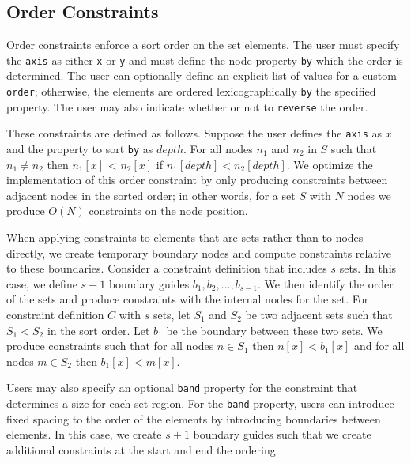 

\subsection{Order Constraints}
Order constraints enforce a sort order on the set elements. The user must 
specify the \texttt{axis} as either \texttt{x} or \texttt{y} and must define
the node property \texttt{by} which the order is determined. 
The user can optionally define an explicit list of values for a custom
\texttt{order}; otherwise, the elements are ordered lexicographically \texttt{by}
the specified property. The user may also indicate whether
or not to \texttt{reverse} the order.

These constraints are defined as follows.  Suppose the user defines the \texttt{axis} as
$x$ and the property to sort \texttt{by} as $depth$. For all nodes $n_1$ 
and $n_2$ in $S$  such that $n_1 \neq n_2$ then $n_1[x]$ < $n_2[x]$
if $n_1[depth] < n_2[depth]$. We optimize the implementation of this order
constraint by only producing constraints between adjacent nodes in the sorted 
order; in other words, for a set $S$ with $N$ nodes we produce $O(N)$ 
constraints on the node position.

When applying constraints to elements that are sets rather than to nodes
directly, we create temporary boundary nodes and compute constraints relative to
these boundaries. Consider a constraint definition that includes $s$ sets. 
In this case, we define $s-1$ boundary guides $b_1, b_2, ..., b_{s-1}$. We then
identify the order of the sets and produce constraints with the internal
nodes for the set. For constraint definition $C$ with $s$ sets, let $S_1$ and
$S_2$ be two adjacent sets such that $S_1 < S_2$ in the sort order. Let $b_1$ be
the boundary between these two sets. We produce constraints such that for all
nodes $n \in S_1$ then $n[x] < b_1[x]$ and for all nodes $m \in S_2$ then $b_1[x] < m[x]$.

Users may also specify an optional
\texttt{band} property for the constraint that determines a size for each
set region. For the \texttt{band} property, users can introduce fixed spacing
to the order of the elements by introducing boundaries between elements. In
this case, we create $s+1$ boundary guides such that we create additional 
constraints at the start and end the ordering.

